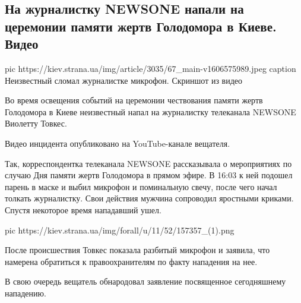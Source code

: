  
 
 
 
 
 
\subsection{На журналистку NEWSONE напали на церемонии памяти жертв Голодомора в Киеве. Видео}
\label{sec:28_11_2020.news.ua.strana.1.napadenia_zhurnalist_newsone}

\ifcmt
pic https://kiev.strana.ua/img/article/3035/67_main-v1606575989.jpeg
caption Неизвестный сломал журналистке микрофон. Скриншот из видео  
\fi


Во время освещения событий на церемонии чествования памяти жертв Голодомора в
Киеве неизвестный напал на журналистку телеканала NEWSONE Виолетту Товкес.

Видео инцидента опубликовано на YouTube-канале вещателя.

Так, корреспондентка телеканала NEWSONE рассказывала о мероприятиях по случаю
Дня памяти жертв Голодомора в прямом эфире. В 16:03 к ней подошел парень в
маске и выбил микрофон и поминальную свечу, после чего начал толкать
журналистку. Свои действия мужчина сопроводил яростными криками. Спустя
некоторое время нападавший ушел.

\ifcmt
pic https://kiev.strana.ua/img/forall/u/11/52/157357_(1).png
\fi

После происшествия Товкес показала разбитый микрофон и заявила, что намерена
обратиться к правоохранителям по факту нападения на нее.

В свою очередь вещатель обнародовал заявление посвященное сегодняшнему
нападению.

